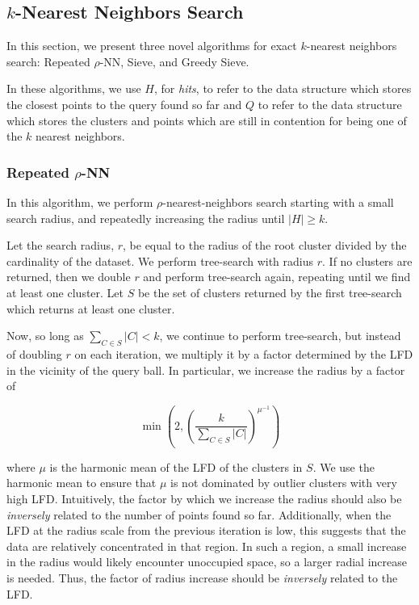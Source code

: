\subsection{\texorpdfstring{$k$}{k}-Nearest Neighbors Search}
\label{subsec:methods:knn-search}

In this section, we present three novel algorithms for exact $k$-nearest neighbors search:
Repeated $\rho$-NN, Sieve, and Greedy Sieve.

In these algorithms, we use $H$, for \emph{hits}, to refer to the data structure which stores the closest points to the query found so far and $Q$ to refer to the data structure which stores the clusters and points which are still in contention for being one of the $k$ nearest neighbors.


\subsubsection{Repeated \texorpdfstring{$\rho$}{p}-NN}
\label{subsubsec:methods:knn-search:repeated-rnn}

In this algorithm, we perform $\rho$-nearest-neighbors search starting with a small search radius, and repeatedly increasing the radius until $|H| \geq k$.

Let the search radius, $r$, be equal to the radius of the root cluster divided by the cardinality of the dataset.
We perform tree-search with radius $r$.
If no clusters are returned, then we double $r$ and perform tree-search again, repeating until we find at least one cluster.
Let $S$ be the set of clusters returned by the first tree-search which returns at least one cluster.

Now, so long as $\sum_{C \in S} |C| < k$, we continue to perform tree-search, but instead of doubling $r$ on each iteration, we multiply it by a factor determined by the LFD in the vicinity of the query ball. 
In particular, we increase the radius by a factor of

\begin{equation}
    \min \left(2, \left( {\frac{k}{\sum_{C \in S} |C|}} \right)^{\mu^{-1}} \right)
    \label{eq:repeated-rnn-factor}
\end{equation}

where $\mu$ is the harmonic mean of the LFD of the clusters in $S$.
We use the harmonic mean to ensure that $\mu$ is not dominated by outlier clusters with very high LFD. 
Intuitively, the factor by which we increase the radius should also be \emph{inversely} related to the number of points found so far. 
Additionally, when the LFD at the radius scale from the previous iteration is low, this suggests that the data are relatively concentrated in that region.
In such a region, a small increase in the radius would likely encounter unoccupied space, so a larger radial increase is needed.
Thus, the factor of radius increase should be \emph{inversely} related to the LFD.

